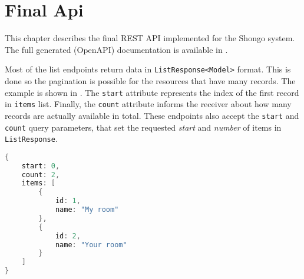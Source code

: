 \chapter{Final Api}
This chapter describes the final REST API implemented for the Shongo system. The full generated (OpenAPI) documentation is available in .

Most of the list endpoints return data in \texttt{ListResponse<Model>} format. This is done so the pagination is possible for the resources that have many records. The example is shown in . The \texttt{start} attribute represents the index of the first record in \texttt{items} list. Finally, the \texttt{count} attribute informs the receiver about how many records are actually available in total.
These endpoints also accept the \texttt{start} and \texttt{count} query parameters, that set the requested \emph{start} and \emph{number} of items in \texttt{ListResponse}. 

\begin{lstlisting}[language=Java, caption=ListResponse, label=lst:listresponse]
{
    start: 0,
    count: 2,
    items: [
        {
            id: 1,
            name: "My room"
        },
        {
            id: 2,
            name: "Your room"
        }
    ]
}
\end{lstlisting}









